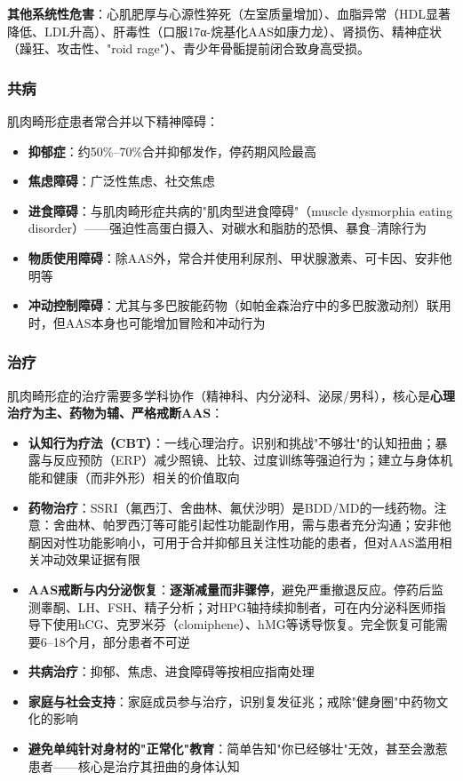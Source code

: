 \begin{enumerate}
\textbf{其他系统性危害}：心肌肥厚与心源性猝死（左室质量增加）、血脂异常（HDL显著降低、LDL升高）、肝毒性（口服17α-烷基化AAS如康力龙）、肾损伤、精神症状（躁狂、攻击性、"roid rage"）、青少年骨骺提前闭合致身高受损。

\subsubsection{共病}

肌肉畸形症患者常合并以下精神障碍：

\begin{itemize}[leftmargin=2cm]
	\item \textbf{抑郁症}：约50\%--70\%合并抑郁发作，停药期风险最高
	\item \textbf{焦虑障碍}：广泛性焦虑、社交焦虑
	\item \textbf{进食障碍}：与肌肉畸形症共病的"肌肉型进食障碍"（muscle dysmorphia eating disorder）——强迫性高蛋白摄入、对碳水和脂肪的恐惧、暴食--清除行为
	\item \textbf{物质使用障碍}：除AAS外，常合并使用利尿剂、甲状腺激素、可卡因、安非他明等
	\item \textbf{冲动控制障碍}：尤其与多巴胺能药物（如帕金森治疗中的多巴胺激动剂）联用时，但AAS本身也可能增加冒险和冲动行为
\end{itemize}

\subsubsection{治疗}

肌肉畸形症的治疗需要多学科协作（精神科、内分泌科、泌尿/男科），核心是\textbf{心理治疗为主、药物为辅、严格戒断AAS}：

\begin{itemize}[leftmargin=2cm]
	\item \textbf{认知行为疗法（CBT）}：一线心理治疗。识别和挑战"不够壮"的认知扭曲；暴露与反应预防（ERP）减少照镜、比较、过度训练等强迫行为；建立与身体机能和健康（而非外形）相关的价值取向
	\item \textbf{药物治疗}：SSRI（氟西汀、舍曲林、氟伏沙明）是BDD/MD的一线药物。注意：舍曲林、帕罗西汀等可能引起性功能副作用，需与患者充分沟通；安非他酮因对性功能影响小，可用于合并抑郁且关注性功能的患者，但对AAS滥用相关冲动效果证据有限
	\item \textbf{AAS戒断与内分泌恢复}：\textbf{逐渐减量而非骤停}，避免严重撤退反应。停药后监测睾酮、LH、FSH、精子分析；对HPG轴持续抑制者，可在内分泌科医师指导下使用hCG、克罗米芬（clomiphene）、hMG等诱导恢复。完全恢复可能需要6--18个月，部分患者不可逆
	\item \textbf{共病治疗}：抑郁、焦虑、进食障碍等按相应指南处理
	\item \textbf{家庭与社会支持}：家庭成员参与治疗，识别复发征兆；戒除"健身圈"中药物文化的影响
	\item \textbf{避免单纯针对身材的"正常化"教育}：简单告知"你已经够壮"无效，甚至会激惹患者——核心是治疗其扭曲的身体认知
\end{itemize}


\end{enumerate}
